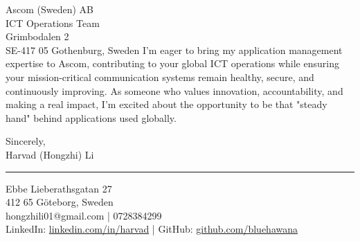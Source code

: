 \documentclass[a4paper,10pt]{article}
\begin{document}
\begin{letter}{\color{darkblue}
Ascom (Sweden) AB\\
ICT Operations Team\\
Grimbodalen 2\\
SE-417 05 Gothenburg, Sweden}
I'm eager to bring my application management expertise to Ascom, contributing to your global ICT operations while ensuring your mission-critical communication systems remain healthy, secure, and continuously improving. As someone who values innovation, accountability, and making a real impact, I'm excited about the opportunity to be that "steady hand" behind applications used globally.

\vspace{10pt}

\closing{
Sincerely,\\
\vspace{15pt}
Harvad (Hongzhi) Li
}

\vspace{20pt}

{\color{darkblue}\rule{\linewidth}{0.6pt}}
\vspace{4pt}

{\color{darkblue}
Ebbe Lieberathsgatan 27\\
412 65 Göteborg, Sweden\\
hongzhili01@gmail.com | 0728384299\\
LinkedIn: \href{https://www.linkedin.com/in/harvad/}{linkedin.com/in/harvad} | GitHub: \href{https://github.com/bluehawana}{github.com/bluehawana}
}

\end{letter}
\end{document}
